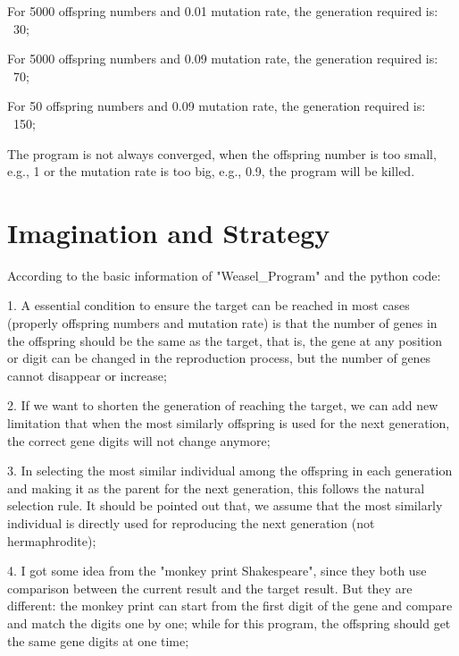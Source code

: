 \documentclass[12pt, letterpaper]{article} %
\begin{document}
For 5000 offspring numbers and 0.01 mutation rate, the generation required is: ~30;

For 5000 offspring numbers and 0.09 mutation rate, the generation required is: ~70;

For 50 offspring numbers and 0.09 mutation rate, the generation required is: ~150;

The program is not always converged, when the offspring number is too small, e.g., 1 or the mutation rate is too big, e.g., 0.9,
the program will be killed.


\section{Imagination and Strategy} %

According to the basic information of "Weasel\_Program" and the python code:

1. A essential condition to ensure the target can be reached in most cases (properly offspring numbers and mutation rate) is
that the number of genes in the offspring should be the same as the target, that is, the gene at any position or digit can be 
changed in the reproduction process, but the number of genes cannot disappear or increase;

2. If we want to shorten the generation of reaching the target, we can add new limitation that when the most similarly offspring 
is used for the next generation, the correct gene digits will not change anymore; 

3. In selecting the most similar individual among the offspring in each generation and making it as the parent for the next 
generation, this follows the natural selection rule. It should be pointed out that, we assume that the most similarly individual
is directly used for reproducing the next generation (not hermaphrodite);

4. I got some idea from the "monkey print Shakespeare", since they both use comparison between the current result and the target 
result. But they are different: the monkey print can start from the first digit of the gene and compare and match the digits one by 
one; while for this program, the offspring should get the same gene digits at one time;
\end{document}
